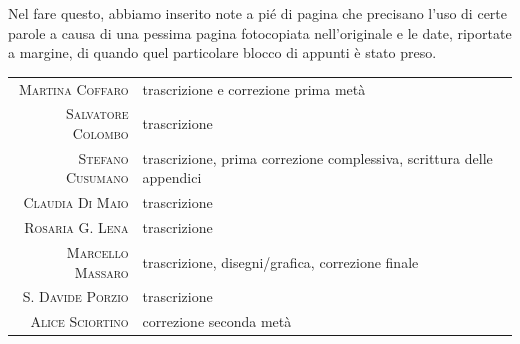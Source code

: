 Nel fare questo, abbiamo inserito note a pié di pagina che precisano l'uso di
certe parole a causa di una pessima pagina fotocopiata nell'originale e le date,
riportate a margine, di quando quel particolare blocco di appunti è stato preso.
\vfill
\begin{tabularx}{0.75\textwidth}{>{\scshape}rX}
  Martina Coffaro   & trascrizione e correzione prima metà\\
  Salvatore Colombo & trascrizione\\
  Stefano Cusumano  & trascrizione, prima correzione complessiva,
                      scrittura delle appendici\\
  Claudia Di Maio   & trascrizione\\
  Rosaria G. Lena   & trascrizione\\
  Marcello Massaro  & trascrizione, disegni/grafica, correzione
                      finale\\
  S. Davide Porzio  & trascrizione\\
  Alice Sciortino   & correzione seconda metà
\end{tabularx}
\vfill

